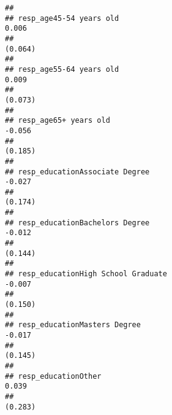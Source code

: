 \documentclass[
]{article}
\begin{document}
\begin{verbatim}
##                                                                                                              
## resp_age45-54 years old                                                                       0.006          
##                                                                                              (0.064)         
##                                                                                                              
## resp_age55-64 years old                                                                       0.009          
##                                                                                              (0.073)         
##                                                                                                              
## resp_age65+ years old                                                                         -0.056         
##                                                                                              (0.185)         
##                                                                                                              
## resp_educationAssociate Degree                                                                -0.027         
##                                                                                              (0.174)         
##                                                                                                              
## resp_educationBachelors Degree                                                                -0.012         
##                                                                                              (0.144)         
##                                                                                                              
## resp_educationHigh School Graduate                                                            -0.007         
##                                                                                              (0.150)         
##                                                                                                              
## resp_educationMasters Degree                                                                  -0.017         
##                                                                                              (0.145)         
##                                                                                                              
## resp_educationOther                                                                           0.039          
##                                                                                              (0.283)         

\end{verbatim}
\end{document}
